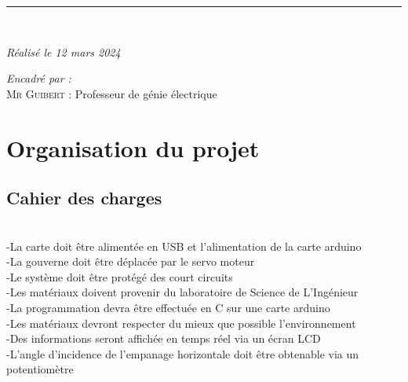 \documentclass[a4paper, 9pt]{article}
\begin{document}
\begin{center}
	\vspace{.15cm}
	\rule{250pt}{0.3mm}\\
	\vspace{.15cm}
	
	\textit{\large{Réalisé le 12 mars 2024}}				
	
	\vspace{0.15cm}
	
	\textit{\large{Encadré par :}}\\
	\vspace{.25cm}
	\Large{	\textsc{Mr Guibert} : Professeur de génie électrique}
    	

\end{center}

\newpage
	\tableofcontents
\newpage

\section{Organisation du projet}
\subsection{Cahier des charges}
\tiny{~}\\
\normalsize-La carte doit être alimentée en USB et l'alimentation de la carte arduino\\
-La gouverne doit être déplacée par le servo moteur\\
-Le système doit être protégé des court circuits\\
-Les matériaux doivent provenir du laboratoire de Science de L'Ingénieur\\
-La programmation devra être effectuée en C sur une carte arduino\\
-Les matériaux devront respecter du mieux que possible l'environnement\\
-Des informations seront affichée en temps réel via un écran LCD\\
-L'angle d'incidence de l'empanage horizontale doit être obtenable via un potentiomètre\\
\end{document}
